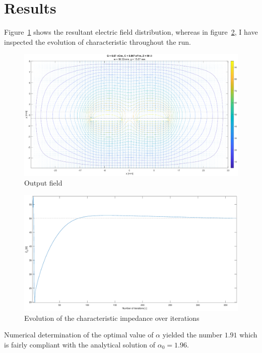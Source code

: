 \documentclass[11pt,a4paper]{article}
\begin{document}
\section{Results}
Figure~\ref{fig:output-field} shows the resultant electric field distribution, whereas in figure~\ref{fig:output-z0-alpha17}, I have inspected the evolution of characteristic throughout the run.
\begin{figure}[!ht]
    \centering
    \includegraphics[width=\textwidth]{src/output_field_alpha1-7.eps}
    \caption{Output field}
    \label{fig:output-field}
\end{figure}
\begin{figure}[!ht]
    \centering
    \includegraphics[width=\textwidth]{src/output_z0_alpha1-7.eps}
    \caption{Evolution of the characteristic impedance over iterations}
    \label{fig:output-z0-alpha17}
\end{figure}

Numerical determination of the optimal value of $\alpha$ yielded the number $1.91$ which is fairly compliant with the analytical solution of $\alpha_0 = 1.96$.
\end{document}

